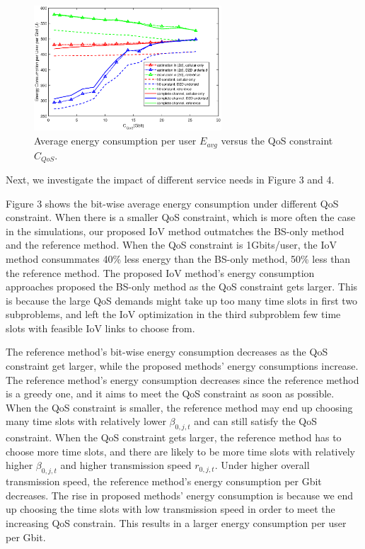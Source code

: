 \documentclass[conference]{IEEEtran}
\begin{document}
\begin{figure} [htb]
\begin{center}
\includegraphics*[width=7cm]{Cqos.eps}
\end{center}
\vspace*{-4mm} 
\caption{Average energy consumption per user $E_{avg}$ versus the QoS constraint ${C_{QoS}}$.}\label{fig:3}
\vspace*{-2mm} 
\end{figure}



Next, we investigate the impact of different service needs in Figure 3 and 4. 

Figure 3 shows the bit-wise average energy consumption under different QoS constraint.
When there is a smaller QoS constraint, which is more often the case in the simulations, our proposed IoV method outmatches the BS-only method and the reference method. When the QoS constraint is 1Gbits/user, the IoV method consummates 40\% less energy than the BS-only method, 50\% less than the reference method. The proposed IoV method's energy consumption approaches proposed the BS-only method as the QoS constraint gets larger. This is because the large QoS demands might take up too many time slots in first two subproblems, and left the IoV optimization in the third subproblem few time slots with feasible IoV links to choose from.

The reference method's bit-wise energy consumption decreases as the QoS constraint get larger, while the proposed methods' energy consumptions increase. The reference method's energy consumption decreases since the reference method is a greedy one, and it aims to meet the QoS constraint as soon as possible. When the QoS constraint is smaller, the reference method may end up choosing many time slots with relatively lower ${\beta _{0,j,t}}$ and can still satisfy the QoS constraint. When the QoS constraint gets larger, the reference method has to choose more time slots, and there are likely to be more time slots with relatively higher ${\beta _{0,j,t}}$ and higher transmission speed ${r_{0,j,t}}$. Under higher overall transmission speed, the reference method's energy consumption per Gbit decreases. The rise in proposed methods' energy consumption is because we end up choosing the time slots with low transmission speed in order to meet the increasing QoS constrain. This results in a larger energy consumption per user per Gbit. 
\end{document}
